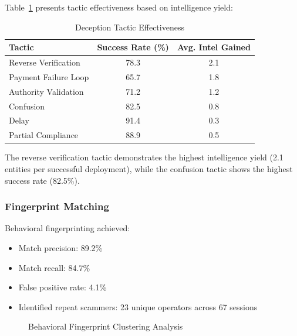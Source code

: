 \documentclass[conference]{IEEEtran}
\begin{document}
Table~\ref{tab:tactics} presents tactic effectiveness based on intelligence yield:

\begin{table}[htbp]
\caption{Deception Tactic Effectiveness}
\label{tab:tactics}
\begin{center}
\begin{tabular}{|l|c|c|}
\hline
\textbf{Tactic} & \textbf{Success Rate (\%)} & \textbf{Avg. Intel Gained} \\
\hline
Reverse Verification & 78.3 & 2.1 \\
\hline
Payment Failure Loop & 65.7 & 1.8 \\
\hline
Authority Validation & 71.2 & 1.2 \\
\hline
Confusion & 82.5 & 0.8 \\
\hline
Delay & 91.4 & 0.3 \\
\hline
Partial Compliance & 88.9 & 0.5 \\
\hline
\end{tabular}
\end{center}
\end{table}

The reverse verification tactic demonstrates the highest intelligence yield (2.1 entities per successful deployment), while the confusion tactic shows the highest success rate (82.5\%).

\subsubsection{Fingerprint Matching}

Behavioral fingerprinting achieved:
\begin{itemize}
    \item Match precision: 89.2\%
    \item Match recall: 84.7\%
    \item False positive rate: 4.1\%
    \item Identified repeat scammers: 23 unique operators across 67 sessions
\end{itemize}

\begin{figure}[htbp]
\centerline{}
\caption{Behavioral Fingerprint Clustering Analysis}
\label{fig:tsne}
\end{figure}
\end{document}
